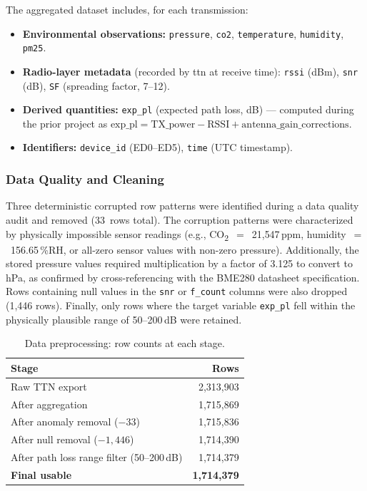 \documentclass[12pt, a4paper, twoside, openright]{report}
\begin{document}
The aggregated dataset includes, for each transmission:
\begin{itemize}
  \item \textbf{Environmental observations:} \texttt{pressure}, \texttt{co2}, \texttt{temperature}, \texttt{humidity}, \texttt{pm25}.
  \item \textbf{Radio-layer metadata} (recorded by \gls{ttn} at receive time): \texttt{rssi} (dBm), \texttt{snr} (dB), \texttt{SF} (spreading factor, 7--12).
  \item \textbf{Derived quantities:} \texttt{exp\_pl} (expected path loss, dB) --- computed during the prior project as $\text{exp\_pl} = \text{TX\_power} - \text{RSSI} + \text{antenna\_gain\_corrections}$.
  \item \textbf{Identifiers:} \texttt{device\_id} (ED0--ED5), \texttt{time} (UTC timestamp).
\end{itemize}

\subsubsection{Data Quality and Cleaning}
Three deterministic corrupted row patterns were identified during a data quality audit and removed (33~rows total). The corruption patterns were characterized by physically impossible sensor readings (e.g., CO\textsubscript{2}~$=$~21{,}547\,ppm, humidity~$=$~156.65\,\%RH, or all-zero sensor values with non-zero pressure). Additionally, the stored pressure values required multiplication by a factor of 3.125 to convert to hPa, as confirmed by cross-referencing with the BME280 datasheet specification. Rows containing null values in the \texttt{snr} or \texttt{f\_count} columns were also dropped (1{,}446 rows). Finally, only rows where the target variable \texttt{exp\_pl} fell within the physically plausible range of 50--200\,dB were retained.

\begin{table}[H]
  \centering
  \begin{tabular}{lr}
    \toprule
    \textbf{Stage} & \textbf{Rows} \\
    \midrule
    Raw TTN export                         & 2,313,903 \\
    After aggregation                      & 1,715,869 \\
    After anomaly removal ($-33$)          & 1,715,836 \\
    After null removal ($-1{,}446$)        & 1,714,390 \\
    After path loss range filter (50--200\,dB) & 1,714,379 \\
    \textbf{Final usable}                  & \textbf{1,714,379} \\
    \bottomrule
  \end{tabular}
  \caption{Data preprocessing: row counts at each stage.}
  \label{tab:data-cleaning}
\end{table}
\end{document}
